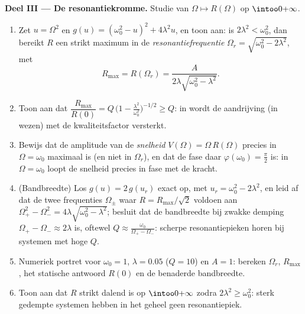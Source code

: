 \begin{problem}
\medskip
\noindent\textbf{Deel III --- De resonantiekromme.} Studie van $\Omega
\mapsto R(\Omega)$ op $\intoo0{+\infty}$.
\begin{enumerate}[resume]
  \item Zet $u = \Omega^2$ en $g(u) = (\omega_0^2 - u)^2 + 4\lambda^2 u$,
        en toon aan: is $2\lambda^2 < \omega_0^2$, dan bereikt $R$ een
        strikt maximum in de \emph{resonantiefrequentie} $\Omega_r =
        \sqrt{\omega_0^2 - 2\lambda^2}$, met
        \[
        R_{\max} = R(\Omega_r)
        = \frac{A}{2\lambda\sqrt{\omega_0^2 - \lambda^2}} .
        \]
  \item Toon aan dat $\dfrac{R_{\max}}{R(0)} = Q\,\bigl(1 -
        \tfrac{\lambda^2}{\omega_0^2}\bigr)^{-1/2} \geq Q$: in
         wordt de aandrijving (in wezen) met de
        kwaliteitsfactor versterkt.
  \item Bewijs dat de amplitude van de \emph{snelheid} $V(\Omega) =
        \Omega\,R(\Omega)$ precies in $\Omega = \omega_0$ maximaal is
        (en niet in $\Omega_r$), en dat de fase daar $\varphi(\omega_0)
        = \frac\pi2$ is: in $\Omega = \omega_0$ loopt de snelheid
        precies in fase met de kracht.
  \item (Bandbreedte) Los $g(u) = 2\,g(u_r)$ exact op, met $u_r =
        \omega_0^2 - 2\lambda^2$, en leid af dat de twee frequenties
        $\Omega_\pm$ waar $R = R_{\max}/\sqrt2$ voldoen aan $\Omega_+^2
        - \Omega_-^2 = 4\lambda\sqrt{\omega_0^2 - \lambda^2}$; besluit
        dat de bandbreedte bij zwakke demping $\Omega_+ - \Omega_-
        \approx 2\lambda$ is, oftewel $Q \approx
        \frac{\omega_0}{\Omega_+ - \Omega_-}$: scherpe resonantiepieken
        horen bij systemen met hoge $Q$.
  \item Numeriek portret voor $\omega_0 = 1$, $\lambda = 0.05$ ($Q =
        10$) en $A = 1$: bereken $\Omega_r$, $R_{\max}$, het statische
        antwoord $R(0)$ en de benaderde bandbreedte.
  \item Toon aan dat $R$ strikt dalend is op $\intoo0{+\infty}$ zodra
        $2\lambda^2 \geq \omega_0^2$: sterk gedempte systemen hebben in
        het geheel geen resonantiepiek.
\end{enumerate}


\end{problem}
